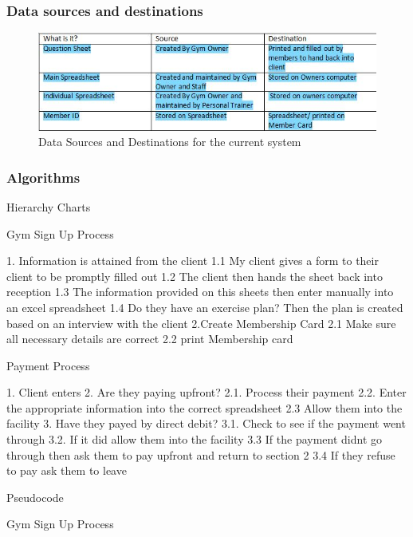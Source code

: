 \subsubsection{Data sources and destinations}

\begin{figure}[H]
    \includegraphics[width=\textwidth]{InvestigationTable1.jpg}
    \caption{Data Sources and Destinations for the current system} \label{fig:Current Destinations}
\end{figure}

\subsubsection{Algorithms}

Hierarchy Charts

Gym Sign Up Process
\begin{python}
1. Information is attained from the client
	1.1 My client gives a form to their client to be promptly filled out
	1.2 The client then hands the sheet back into reception 
	1.3 The information provided on this sheets then enter manually into an excel spreadsheet
	1.4 Do they have an exercise plan? Then the plan is created based on an interview with the client
2.Create Membership Card
	2.1 Make sure all necessary details are correct
	2.2 print Membership card 
\end{python}

Payment Process
\begin{python}
1. Client enters
2. Are they paying upfront?
2.1. Process their payment
2.2. Enter the appropriate information into the correct spreadsheet
2.3 Allow them into the facility
3. Have they payed by direct debit?
3.1. Check to see if the payment went through
3.2. If it did allow them into the facility
3.3 If the payment didnt go through then ask them to pay upfront and return to section 2
3.4 If they refuse to pay ask them to leave
\end{python}

Pseudocode


Gym Sign Up Process

